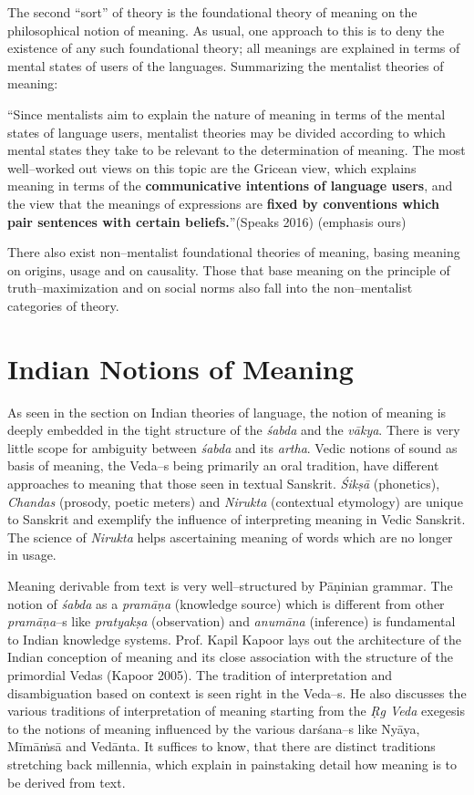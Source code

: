 The second “sort” of theory is the foundational theory of meaning on the philosophical notion of meaning. As usual, one approach to this is to deny the existence of any such foundational theory; all meanings are explained in terms of mental states of users of the languages. Summarizing the mentalist theories of meaning:

\begin{myquote}
“Since mentalists aim to explain the nature of meaning in terms of the mental states of language users, mentalist theories may be divided according to which mental states they take to be relevant to the determination of meaning. The most well–worked out views on this topic are the Gricean view, which explains meaning in terms of the \textbf{communicative intentions of language users}, and the view that the meanings of expressions are \textbf{fixed by conventions which pair sentences with certain beliefs.}”\hfill (Speaks 2016) (emphasis ours)
\end{myquote}

There also exist non–mentalist foundational theories of meaning, basing meaning on origins, usage and on causality. Those that base meaning on the principle of truth–maximization and on social norms also fall into the non–mentalist categories of theory.


\section*{Indian Notions of Meaning}

\vskip -5pt

As seen in the section on Indian theories of language, the notion of meaning is deeply embedded in the tight structure of the \textit{śabda} and the \textit{vākya}. There is very little scope for ambiguity between \textit{śabda} and its \textit{artha}. Vedic notions of sound as basis of meaning, the Veda–s being primarily an oral tradition, have different approaches to meaning that those seen in textual Sanskrit. \textit{Śikṣā} (phonetics), \textit{Chandas} (prosody, poetic meters) and \textit{Nirukta} (contextual etymology) are unique to Sanskrit and exemplify the influence of interpreting meaning in Vedic Sanskrit. The science of \textit{Nirukta} helps ascertaining meaning of words which are no longer in usage.

Meaning derivable from text is very well–structured by Pāṇinian grammar. The notion of \textit{śabda} as a \textit{pramāṇa} (knowledge source) which is different from other \textit{pramāṇa}–s like \textit{pratyakṣa} (observation) and \textit{anumāna} (inference) is fundamental to Indian knowledge systems. Prof. Kapil Kapoor lays out the architecture of the Indian conception of meaning and its close association with the structure of the primordial Vedas (Kapoor 2005). The tradition of interpretation and disambiguation based on context is seen right in the Veda–s. He also discusses the various traditions of interpretation of meaning starting from the \textit{Ṛg Veda} exegesis to the notions of meaning influenced by the various darśana–s like Nyāya, Mīmāṁsā and Vedānta. It suffices to know, that there are distinct traditions stretching back millennia, which explain in painstaking detail how meaning is to be derived from text.

